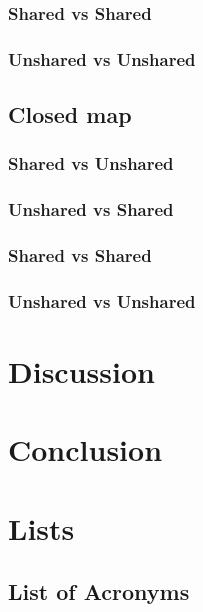 \documentclass[]{report}
\begin{document}
		\subsection{Shared vs Shared}
		\subsection{Unshared vs Unshared}
		\section{Closed map}
		\subsection{Shared vs Unshared}
		\subsection{Unshared vs Shared}
		\subsection{Shared vs Shared}
		\subsection{Unshared vs Unshared}
		\chapter{Discussion}
		
		\chapter{Conclusion}
		
		
		\newpage
		\chapter{Lists}
		\section*{List of Acronyms}
		\begin{acronym}[FOW]
		\end{acronym}
		
		\listoffigures
		\listoftables
		
		
		
	
\end{document}

